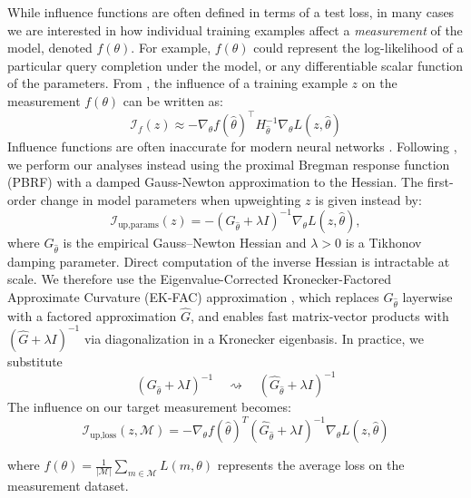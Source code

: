 \documentclass{article}
\theoremstyle{plain}
\theoremstyle{definition}
\theoremstyle{remark}
\begin{document}
While influence functions are often defined in terms of a test loss, in many cases we are interested in how individual training examples affect a \textit{measurement} of the model, denoted $f(\theta)$. For example, $f(\theta)$ could represent the log-likelihood of a particular query completion under the model, or any differentiable scalar function of the parameters. From \citet{grosse2023studying}, the influence of a training example $z$ on the measurement $f(\theta)$ can be written as:
\begin{equation}
\mathcal{I}_{f}(z) \approx -\nabla_{\theta} f(\hat{\theta})^{\top} 
H_{\hat{\theta}}^{-1}
\nabla_{\theta} L(z, \hat{\theta})
\end{equation}
Influence functions are often inaccurate for modern neural networks \citep{bae2022if}. Following \citet{bae2022if}, we perform our analyses instead using the proximal Bregman response function (PBRF) with a damped Gauss-Newton approximation to the Hessian. The first-order change in
model parameters when upweighting $z$ is given instead by:
\begin{equation}
  \mathcal{I}_{\text{up,params}}(z)
  = -(G_{\hat\theta} + \lambda I)^{-1}\nabla_\theta L(z,\hat\theta),
  \label{eq:pbrf}
\end{equation}
where $G_{\hat\theta}$ is the empirical Gauss--Newton Hessian and $\lambda > 0$ is a Tikhonov damping parameter. Direct computation of the inverse Hessian is intractable at scale. We therefore use
the Eigenvalue-Corrected Kronecker-Factored Approximate Curvature (EK-FAC)
approximation \citep{grosse2023studying}, which replaces
$G_{\hat\theta}$ layerwise with a factored approximation $\hat{G}$, and enables fast
matrix-vector products with $(\hat{G}+\lambda I)^{-1}$ via diagonalization in a
Kronecker eigenbasis. In practice, we substitute
\begin{equation}
(G_{\hat\theta} + \lambda I)^{-1}
\quad \rightsquigarrow \quad
(\hat{G}_{\hat\theta} + \lambda I)^{-1}
\end{equation}
The influence on our target measurement becomes:
\begin{equation}
\mathcal{I}_{\text{up,loss}}(z, \mathcal{M}) = -\nabla_\theta f(\hat{\theta})^T(\hat G_{\hat\theta} + \lambda I)^{-1}\nabla_\theta L(z,\hat\theta)
\label{eq:iuploss}
\end{equation}

where $f(\theta) = \frac{1}{|\mathcal{M}|} \sum_{m \in \mathcal{M}} L(m, \theta)$ represents the average loss on the measurement dataset.
\end{document}
